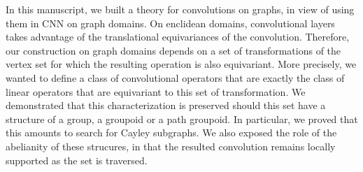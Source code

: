 In this manuscript, we built a theory for convolutions on graphs, in view of using them in CNN on graph domains. On enclidean domains, convolutional layers takes advantage of the translational equivariances of the convolution. Therefore, our construction on graph domains depends on a set of transformations of the vertex set for which the resulting operation is also equivariant. More precisely, we wanted to define a class of convolutional operators that are exactly the class of linear operators that are equivariant to this set of transformation. We demonstrated that this characterization is preserved should this set have a structure of a group, a groupoid or a path groupoid. In particular, we proved that this amounts to search for Cayley subgraphs. We also exposed the role of the abelianity of these strucures, in that the resulted convolution remains locally supported as the set is traversed.



